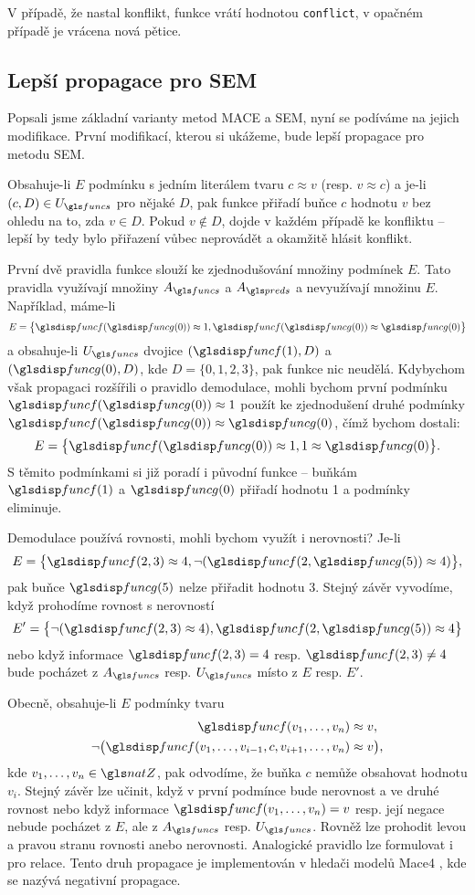 V případě, že nastal konflikt, funkce
 vrátí hodnotou \texttt{conflict},
v opačném případě je vrácena nová pětice.

\subsection{Lepší propagace pro SEM}

Popsali jsme základní varianty metod MACE a SEM,
nyní se podíváme na jejich modifikace.
První modifikací, kterou si ukážeme, bude lepší
propagace pro metodu SEM.

Obsahuje-li $E$ podmínku s jedním literálem tvaru $c \approx v$
(resp. $v \approx c$) a je-li $(c, D) \in U_\funcs$ pro nějaké $D$,
pak funkce  přiřadí buňce $c$ hodnotu $v$
bez ohledu na to, zda $v \in D$. Pokud $v \notin D$, dojde
v každém případě ke konfliktu -- lepší by tedy bylo přiřazení vůbec
neprovádět a okamžitě hlásit konflikt.

První dvě pravidla funkce  slouží
ke zjednodušování množiny podmínek $E$.
Tato pravidla využívají množiny $A_\funcs$ a $A_\preds$
a nevyužívají množinu $E$.
Například, máme-li
\[
  E = \bigl\{ \func(\funcG(0)) \approx 1,
              \func(\funcG(0)) \approx \funcG(0) \bigr\}
\]
a obsahuje-li $U_\funcs$ dvojice $(\func(1), D)$
a $(\funcG(0), D)$, kde $D = \{ 0, 1, 2, 3 \}$, pak funkce
 nic neudělá.
Kdybychom však propagaci rozšířili o pravidlo demodulace,
mohli bychom první podmínku $\func(\funcG(0)) \approx 1$
použít ke zjednodušení druhé podmínky $\func(\funcG(0)) \approx \funcG(0)$,
čímž bychom dostali:
\[
  E = \bigl\{ \func(\funcG(0)) \approx 1, 1 \approx \funcG(0) \bigr\}.
\]
S těmito podmínkami si již poradí i původní funkce 
-- buňkám $\func(1)$ a $\funcG(0)$ přiřadí hodnotu 1 a podmínky eliminuje.

Demodulace používá rovnosti, mohli bychom využít i nerovnosti?
Je-li
\[
  E = \bigl\{ \func(2, 3) \approx 4,
              \neg (\func(2, \funcG(5)) \approx 4) \bigr\},
\]
pak buňce $\funcG(5)$ nelze přiřadit hodnotu 3. Stejný
závěr vyvodíme, když prohodíme rovnost s nerovností
\[
  E' = \bigl\{ \neg (\func(2, 3) \approx 4),
              \func(2, \funcG(5)) \approx 4 \bigr\}
\]
nebo když informace $\func(2, 3) = 4$ resp. $\func(2, 3) \neq 4$  bude
pocházet z $A_\funcs$ resp. $U_\funcs$ místo z $E$ resp. $E'$.

Obecně, obsahuje-li $E$ podmínky tvaru
\begin{align*}
\func(v_1 \comdots v_n) &\approx v, \\
\neg \bigl(\func(v_1 \comdots v_{i-1}, c, v_{i+1} \comdots  v_n)
  &\approx v\bigr),
\end{align*}
kde $v_1 \comdots v_n \in \natZ$, pak odvodíme, že buňka $c$ nemůže
obsahovat hodnotu $v_i$. Stejný závěr lze učinit, když
v první podmínce bude nerovnost a ve druhé rovnost
nebo když informace $\func(v_1 \comdots v_n) = v$ resp. její
negace nebude pocházet z $E$, ale z $A_\funcs$ resp. $U_\funcs$.
Rovněž lze prohodit levou a pravou stranu rovnosti anebo
nerovnosti. Analogické pravidlo lze formulovat i pro relace.
Tento druh propagace je implementován v hledači modelů Mace4
\cite{mccune03mace4}, kde se nazývá negativní propagace.

